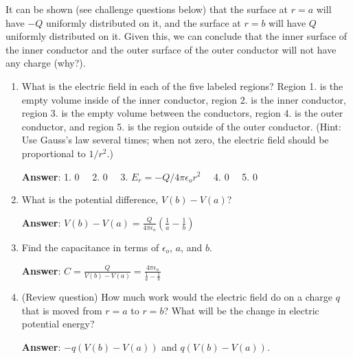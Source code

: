 \documentclass{article}
\begin{document}


It can be shown (see challenge questions below) that the surface at $r=a$ will have $-Q$ uniformly distributed on it, and the surface at $r=b$ will have $Q$ uniformly distributed on it. Given this, we can conclude that the inner surface of the inner conductor and the outer surface of the outer conductor will not have any charge (why?).

\begin{enumerate}

  \item What is the electric field in each of the five labeled regions? Region 1. is the empty volume inside of the inner conductor, region 2. is the inner conductor, region 3. is the empty volume between the conductors, region 4. is the outer conductor, and region 5. is the region outside of the outer conductor. (Hint: Use Gauss's law several times; when not zero, the electric field should be proportional to $1/r^2$.)

        \ifsolutions
        \textbf{Answer}: 1. $0\quad$ 2. $0\quad$ 3. $E_r=-Q/4\pi \epsilon_o r^2\quad$ 4. $0\quad$ 5. $0$
        \else
        \vskip 72pt
        \fi

  \item What is the potential difference, $V(b) - V(a)$?


        \ifsolutions
        \textbf{Answer}: $\displaystyle V(b)-V(a)=\frac{Q}{4\pi\epsilon_o}\left(\frac{1}{a}-\frac{1}{b}\right)$

        \else
        \vskip 72pt
        \fi

  \item Find the capacitance in terms of $\epsilon_o$, $a$, and $b$.

        \ifsolutions
        \textbf{Answer}: $\displaystyle C=\frac{Q}{V(b)-V(a)} = \frac{4\pi\epsilon_o}{\frac{1}{a}-\frac{1}{b}}$
        \else
        \vskip 72pt
        \fi

  \item (Review question) How much work would the electric field do on a charge $q$ that is moved from $r=a$ to $r=b$? What will be the change in electric potential energy?

        \ifsolutions
        \textbf{Answer}: $-q(V(b)-V(a))$ and $q(V(b)-V(a))$.
        \fi

\end{enumerate}
\end{document}
